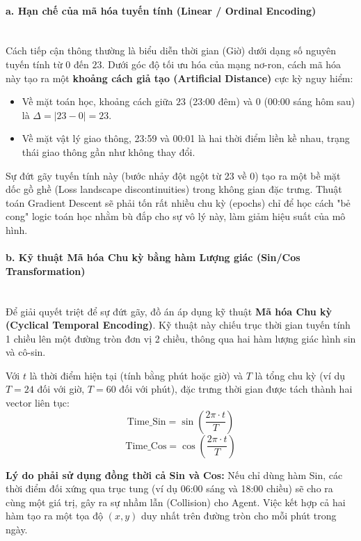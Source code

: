 \paragraph{a. Hạn chế của mã hóa tuyến tính (Linear / Ordinal Encoding)} \mbox{} \\
Cách tiếp cận thông thường là biểu diễn thời gian (Giờ) dưới dạng số nguyên tuyến tính từ $0$ đến $23$. Dưới góc độ tối ưu hóa của mạng nơ-ron, cách mã hóa này tạo ra một \textbf{khoảng cách giả tạo (Artificial Distance)} cực kỳ nguy hiểm:
\begin{itemize}
    \item Về mặt toán học, khoảng cách giữa $23$ (23:00 đêm) và $0$ (00:00 sáng hôm sau) là $\Delta = |23 - 0| = 23$.
    \item Về mặt vật lý giao thông, 23:59 và 00:01 là hai thời điểm liền kề nhau, trạng thái giao thông gần như không thay đổi.
\end{itemize}
Sự đứt gãy tuyến tính này (bước nhảy đột ngột từ 23 về 0) tạo ra một bề mặt dốc gồ ghề (Loss landscape discontinuities) trong không gian đặc trưng. Thuật toán Gradient Descent sẽ phải tốn rất nhiều chu kỳ (epochs) chỉ để học cách "bẻ cong" logic toán học nhằm bù đắp cho sự vô lý này, làm giảm hiệu suất của mô hình.

\paragraph{b. Kỹ thuật Mã hóa Chu kỳ bằng hàm Lượng giác (Sin/Cos Transformation)} \mbox{} \\
Để giải quyết triệt để sự đứt gãy, đồ án áp dụng kỹ thuật \textbf{Mã hóa Chu kỳ (Cyclical Temporal Encoding)}. Kỹ thuật này chiếu trục thời gian tuyến tính 1 chiều lên một đường tròn đơn vị 2 chiều, thông qua hai hàm lượng giác hình sin và cô-sin.

Với $t$ là thời điểm hiện tại (tính bằng phút hoặc giờ) và $T$ là tổng chu kỳ (ví dụ $T = 24$ đối với giờ, $T = 60$ đối với phút), đặc trưng thời gian được tách thành hai vector liên tục:
\begin{equation}
    \text{Time\_Sin} = \sin\left(\frac{2\pi \cdot t}{T}\right)
\end{equation}
\begin{equation}
    \text{Time\_Cos} = \cos\left(\frac{2\pi \cdot t}{T}\right)
\end{equation}

\textbf{Lý do phải sử dụng đồng thời cả Sin và Cos:} Nếu chỉ dùng hàm Sin, các thời điểm đối xứng qua trục tung (ví dụ 06:00 sáng và 18:00 chiều) sẽ cho ra cùng một giá trị, gây ra sự nhầm lẫn (Collision) cho Agent. Việc kết hợp cả hai hàm tạo ra một tọa độ $(x, y)$ duy nhất trên đường tròn cho mỗi phút trong ngày.


